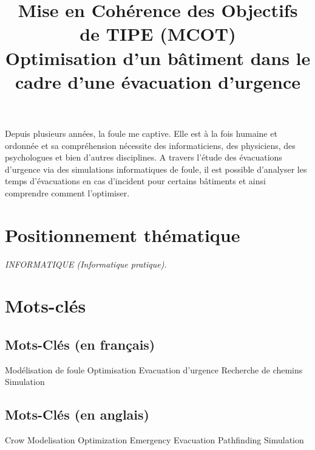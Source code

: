 \documentclass[12pt]{article}
\title{Mise en Cohérence des Objectifs de TIPE (MCOT) \\
Optimisation d'un bâtiment dans le cadre d'une évacuation d'urgence}
\author{}
\date{}
\begin{document}
\maketitle

Depuis plusieurs années, la foule me captive. Elle est à la fois humaine et ordonnée et sa compréhension nécessite des informaticiens, des physiciens, des psychologues et bien d'autres disciplines.
\newline\newline
A travers l'étude des évacuations d'urgence via des simulations informatiques de foule, il est possible d'analyser les temps d'évacuations en cas d'incident pour certains bâtiments et ainsi comprendre comment l'optimiser.

\section*{Positionnement thématique}
\textit{INFORMATIQUE (Informatique pratique).}

\section*{Mots-clés}
\begin{multicols}{2}

    \subsection*{Mots-Clés (en français)}
    Modélisation de foule
    \newline Optimisation
    \newline Evacuation d'urgence
    \newline Recherche de chemins
    \newline Simulation 

    \columnbreak %

    \subsection*{Mots-Clés (en anglais)}
    Crow Modelisation
    \newline Optimization
    \newline Emergency Evacuation
    \newline Pathfinding
    \newline Simulation

\end{multicols}
\end{document}
